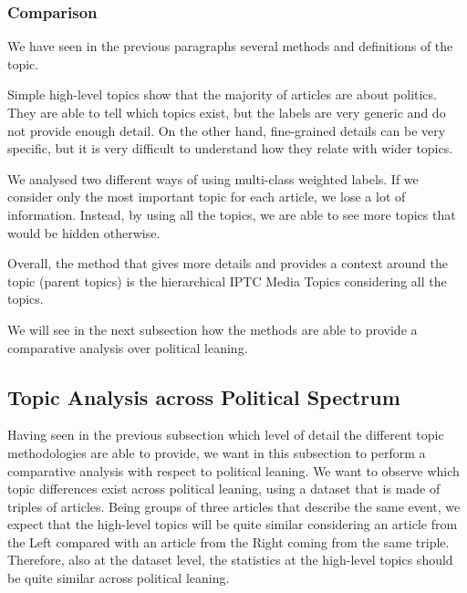 

\subsubsection{\statusgreen Comparison}

We have seen in the previous paragraphs several methods and definitions of the topic.

Simple high-level topics show that the majority of articles are about politics. They are able to tell which topics exist, but the labels are very generic and do not provide enough detail.
On the other hand, fine-grained details can be very specific, but it is very difficult to understand how they relate with wider topics.

We analysed two different ways of using multi-class weighted labels. If we consider only the most important topic for each article, we lose a lot of information. Instead, by using all the topics, we are able to see more topics that would be hidden otherwise.

Overall, the method that gives more details and provides a context around the topic (parent topics) is the hierarchical IPTC Media Topics considering all the topics.

We will see in the next subsection how the methods are able to provide a comparative analysis over political leaning.



\subsection{\statusgreen Topic Analysis across Political Spectrum}
\label{ssec:topics_topics_leaning}

Having seen in the previous subsection which level of detail the different topic methodologies are able to provide, we want in this subsection to perform a comparative analysis with respect to political leaning.
We want to observe which topic differences exist across political leaning, using a dataset that is made of triples of articles.
Being groups of three articles that describe the same event, we expect that the high-level topics will be quite similar considering an article from the Left compared with an article from the Right coming from the same triple.
Therefore, also at the dataset level, the statistics at the high-level topics should be quite similar across political leaning.

